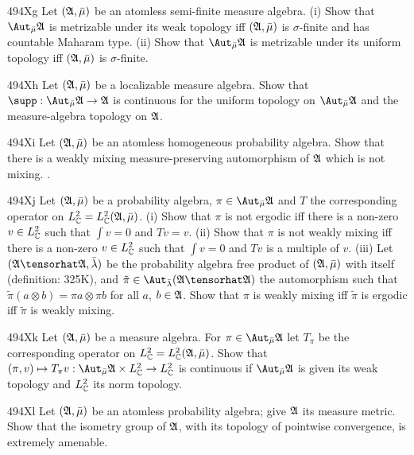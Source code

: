 {\spheader 494Xg Let $(\frak A,\bar\mu)$ be an atomless semi-finite
measure algebra.
(i) Show that $\AmuA$ is metrizable under its weak topology iff
$(\frak A,\bar\mu)$ is $\sigma$-finite and has countable Maharam type.
(ii) Show that $\AmuA$ is metrizable under its uniform topology iff
$(\frak A,\bar\mu)$ is $\sigma$-finite.

\spheader 494Xh Let $(\frak A,\bar\mu)$ be a localizable measure algebra.
Show that $\supp:\AmuA\to\frak A$ is continuous for the uniform topology on
$\AmuA$ and the measure-algebra topology on $\frak A$.

\spheader 494Xi Let $(\frak A,\bar\mu)$ be an atomless homogeneous
probability algebra.   Show that there is a weakly mixing
measure-preserving automorphism of $\frak A$ which is not mixing.
.

\spheader 494Xj Let $(\frak A,\bar\mu)$ be a probability algebra,
$\pi\in\AmuA$ and $T$ the corresponding operator on
$L^2_{\Bbb C}=L^2_{\Bbb C}(\frak A,\bar\mu)$.   (i)
Show that $\pi$ is not ergodic iff there is a non-zero
$v\in L^2_{\Bbb C}$ such that $\int v=0$ and $Tv=v$.   (ii) Show that
$\pi$ is not weakly mixing iff there is a non-zero $v\in L^2_{\Bbb C}$
such that $\int v=0$ and $Tv$ is a multiple of $v$.   (iii)
Let $(\frak A\tensorhat\frak A,\bar\lambda)$ be the probability algebra
free product of $(\frak A,\bar\mu)$ with itself (definition:  325K), and
$\tilde\pi\in\Aut_{\bar\lambda}(\frak A\tensorhat\frak A)$ the automorphism
such that $\tilde\pi(a\otimes b)=\pi a\otimes\pi b$ for all $a$,
$b\in\frak A$.   Show that $\pi$ is weakly mixing iff $\tilde\pi$ is
ergodic iff $\tilde\pi$ is weakly mixing.

\spheader 494Xk Let $(\frak A,\bar\mu)$ be a measure algebra.   For
$\pi\in\AmuA$ let $T_{\pi}$ be the corresponding operator on
$L^2_{\Bbb C}=L^2_{\Bbb C}(\frak A,\bar\mu)$.   Show that
$(\pi,v)\mapsto T_{\pi}v:\AmuA\times L^2_{\Bbb C}\to L^2_{\Bbb C}$ is
continuous if $\AmuA$ is given its weak topology and $L^2_{\Bbb C}$ its
norm topology.

\spheader 494Xl
Let $(\frak A,\bar\mu)$ be an atomless probability
algebra;  give $\frak A$ its measure metric.   Show that the
isometry group of $\frak A$, with its topology of pointwise convergence,
is extremely amenable.   

}
